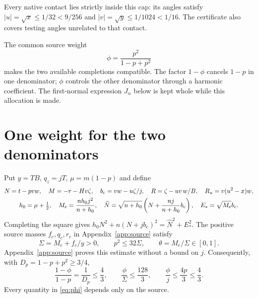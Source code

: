 \documentclass[10pt]{article}
\newcommand{\half}{\tfrac12}
\newcommand{\bc}{b_{\mathrm c}}
\begin{document}
Every native contact lies strictly inside this cap: its angles satisfy
$|u|=\sqrt{x}\leq1/32<9/256$ and
$|v|=\sqrt{y}\leq1/1024<1/16$. The certificate also covers
testing angles unrelated to that contact.

The common source weight
\[
 \phi=\frac{p^2}{1-p+p^2}
\]
makes the two available completions compatible. The factor $1-\phi$ cancels
$1-p$ in one denominator; $\phi$ controls the other denominator through a
harmonic coefficient. The first-normal expression $J_\alpha$ below is kept
whole while this allocation is made.

\section{One weight for the two denominators}
Put $y=TB$, $q_z=jT$, $\mu=m(1-p)$ and define
\begin{gather}
 N=t-pvw,\quad M=-r-Hv\zeta,\quad
 \bc=vw-u\zeta/j,\quad R=\zeta-uv\,w/B,\quad R_u=v(u^2-x)w,\notag\\
 h_0=\mu+\half,\quad
 M_e=\frac{nh_0j^2}{n+h_0},\quad
 \widehat N=\sqrt{n+h_0}\left(N+\frac{nj}{n+h_0}\bc\right),\quad
 E_*=\sqrt{M_e}\bc .
 \label{eq:normal}
\end{gather}
Completing the square gives
$h_0N^2+n(N+j\bc)^2=\widehat N^2+E_*^2$.
The positive source masses $f_c,q_c,r_c$ in Appendix~\ref{app:source} satisfy
\begin{equation}
 \Sigma=M_e+f_c/y>0,\qquad p^2\leq32\Sigma,\qquad
 \theta=M_e/\Sigma\in[0,1].
 \label{eq:harmonic}
\end{equation}
Appendix~\ref{app:source} proves this estimate without a bound on $j$.
Consequently, with $D_p=1-p+p^2\geq3/4$,
\begin{equation}
 \frac{1-\phi}{1-p}=\frac1{D_p}\leq\frac43,\qquad
 \frac{\phi}{\Sigma}\leq\frac{128}{3},\qquad
 \frac{\phi}{j}\leq\frac{4p}{3}\leq\frac43 .
 \label{eq:phi}
\end{equation}
Every quantity in \eqref{eq:phi} depends only on the source.
\end{document}
